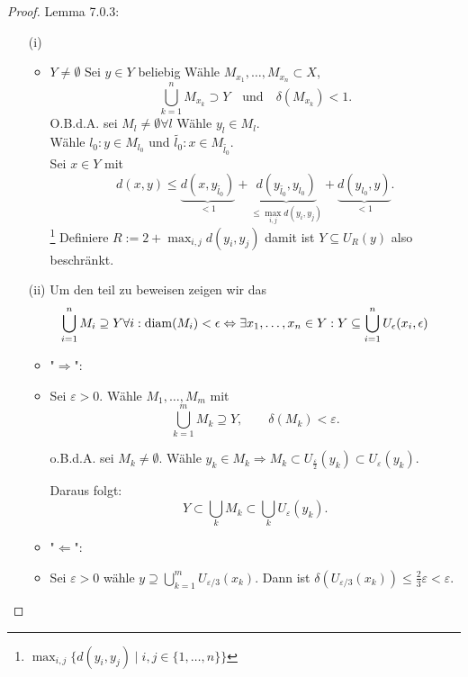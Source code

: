 \begin{proof}{Lemma 7.0.3:}\\
    \begin{itemize}
    \item[(i)]
    \begin{itemize}
         $Y = \emptyset \quad \checkmark$
        \item $Y \neq \emptyset$ Sei $y \in Y$ beliebig
        Wähle $M_{x_1}, \ldots, M_{x_n} \subset X$, 
        $$
        \bigcup_{k=1}^n M_{x_k} \supset Y 
        \quad \text{und} \quad 
        \delta(M_{x_k}) < 1.
        $$
        O.B.d.A. sei $M_l \neq \emptyset \forall l$ Wähle $y_l \in M_l$.\\
        Wähle $l_0: y \in M_{l_0}$ und $\tilde{l_0}: x \in M_{\tilde{l_0}}$.\\
        Sei $x \in Y$ mit 
        $$
        d(x,y)\le
        \underbrace{d(x,y_{\tilde{l_0}})}_{<1}+
        \underbrace{d(y_{\tilde{l_0}},y_{l_0})}_{\leq \max_{i,j} d(y_i,y_j)}+
        \underbrace{d(y_{l_0},y)}_{<1}.
        $$
        \footnote{$\displaystyle \max_{i,j}\{d(y_i,y_j)\mid i,j \in \{1,\dots,n\}\}$}
        Definiere $R:= 2 + \max_{i,j} d(y_i,y_j)$
        damit ist $Y \subseteq U_R(y)$ also beschränkt.
    \end{itemize}
    \item[(ii)]
    Um den teil zu beweisen zeigen wir das
    $$
    \bigcup_{i=1}^n M_i  \supseteq Y  \forall i: \operatorname{diam}(M_i) < \epsilon
    \Leftrightarrow 
    \exists x_1, \ldots, x_n \in Y : Y \subseteq \bigcup_{i=1}^n U_{\epsilon}(x_i, \epsilon)
    $$
\begin{itemize}
    \item "$\Rightarrow$":
    \item Sei $\varepsilon > 0$.  
    Wähle $M_1, \ldots, M_m$ mit 
    $$
    \bigcup_{k=1}^m M_k \supseteq Y, 
    \qquad 
    \delta(M_k) < \varepsilon.
    $$

    o.B.d.A. sei $M_k \neq \emptyset$.  
    Wähle $y_k \in M_k \Rightarrow M_k \subset U_{\tfrac{\varepsilon}{2}}(y_k) \subset U_{\varepsilon}(y_k)$.

    Daraus folgt:
    $$
    Y \subset \bigcup_k M_k \subset \bigcup_k U_{\varepsilon}(y_k).
    $$
    \item "$\Leftarrow$":
    \item Sei $\varepsilon > 0$ wähle $y\supseteq \bigcup_{k=1}^m U_{\varepsilon / 3}(x_k)$.
    Dann ist $\delta(U_{\varepsilon / 3}(x_k)) \leq \frac{2}{3}\varepsilon < \varepsilon$.
    \end{itemize}
\end{itemize}
\end{proof}


